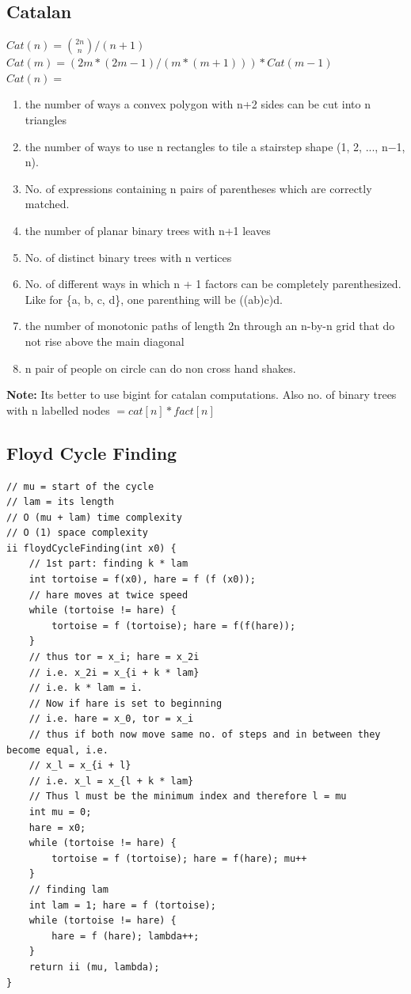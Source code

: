 \documentclass[8pt, a4paper, oneside, twocolumn]{extarticle}
\begin{document}
\subsection{Catalan}
$Cat(n) = \binom{2n}{n} / (n + 1)$
\\$Cat(m) = (2m*(2m - 1)/(m*(m + 1))) * Cat(m - 1)$
\\$Cat(n) = $\begin{enumerate}
    \item the number of ways a convex polygon with n+2 sides can be cut into n triangles
    \item the number of ways to use n rectangles to tile a stairstep shape (1, 2, ..., n−1, n).
    \item No. of expressions containing n pairs of parentheses which are correctly matched.
    \item the number of planar binary trees with n+1 leaves
    \item No. of distinct binary trees with n vertices
    \item No. of different ways in which n + 1 factors can be completely parenthesized. Like for \{a, b, c, d\}, one parenthing will be ((ab)c)d.
    \item the number of monotonic paths of length 2n through an n-by-n grid that do not rise above the main diagonal
    \item n pair of people on circle can do non cross hand shakes.
\end{enumerate}
\textbf{Note: }Its better to use bigint for catalan computations. Also no. of binary trees with n labelled nodes $= cat[n] * fact[n]$
\subsection{Floyd Cycle Finding}
\begin{verbatim}
// mu = start of the cycle
// lam = its length
// O (mu + lam) time complexity
// O (1) space complexity
ii floydCycleFinding(int x0) {
    // 1st part: finding k * lam
    int tortoise = f(x0), hare = f (f (x0));
    // hare moves at twice speed
    while (tortoise != hare) {
        tortoise = f (tortoise); hare = f(f(hare));
    }
    // thus tor = x_i; hare = x_2i
    // i.e. x_2i = x_{i + k * lam}
    // i.e. k * lam = i.
    // Now if hare is set to beginning
    // i.e. hare = x_0, tor = x_i
    // thus if both now move same no. of steps and in between they become equal, i.e.
    // x_l = x_{i + l}
    // i.e. x_l = x_{l + k * lam}
    // Thus l must be the minimum index and therefore l = mu
    int mu = 0;
    hare = x0;
    while (tortoise != hare) {
        tortoise = f (tortoise); hare = f(hare); mu++
    }
    // finding lam
    int lam = 1; hare = f (tortoise);
    while (tortoise != hare) {
        hare = f (hare); lambda++;
    }
    return ii (mu, lambda);
}
\end{verbatim}
\end{document}
